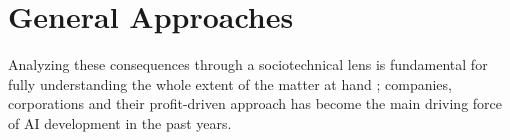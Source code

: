 \section{General Approaches}\label{sec:approaches}

Analyzing these consequences through a sociotechnical lens is fundamental for fully understanding the whole extent of the matter at hand \parencite{THETE, NOVAIA}; companies, corporations and their profit-driven approach has become the main driving force of AI development in the past years.